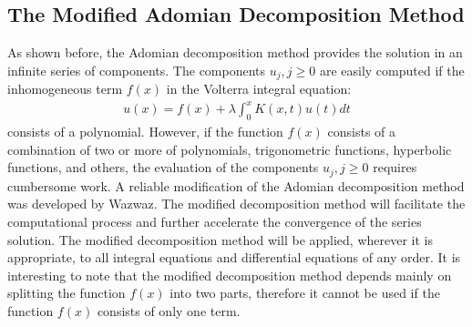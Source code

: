 \documentclass[11pt]{report}
\begin{document}
	\subsection{The Modified Adomian Decomposition Method}
	As shown before, the Adomian decomposition method provides the solution in an infinite series of components. The components $u_j,j \geq 0$ are easily computed if the inhomogeneous term $f(x)$ in the Volterra integral equation: 
	\begin{eqnarray}
		u(x) = f(x) +  \lambda\int_{0}^{x} K(x,t) u(t) dt
	\end{eqnarray}
	consists of a polynomial. However, if the function $f(x)$ consists of a combination of two or more of polynomials, trigonometric functions, hyperbolic functions, and others, the evaluation of the components $u_j,j \geq 0$ requires cumbersome work. A reliable modification of the Adomian decomposition method was developed by Wazwaz. The modified decomposition method will facilitate the computational process and further accelerate the convergence of the series solution. The modified decomposition method will be applied, wherever it is appropriate, to all integral equations and differential equations of any order. It is interesting to note that the modified decomposition method depends mainly on splitting the function $f(x)$ into two parts, therefore it cannot be used if the function $f(x)$ consists of only one term.\\
	
\end{document}
